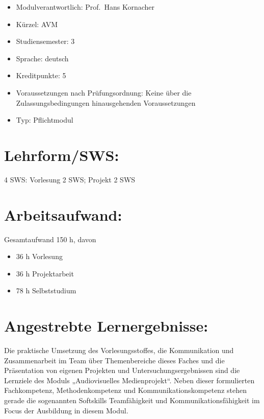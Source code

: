 \begin{itemize}
\tightlist
\item
  Modulverantwortlich: Prof.~Hans Kornacher
\item
  Kürzel: AVM
\item
  Studiensemester: 3
\item
  Sprache: deutsch
\item
  Kreditpunkte: 5
\item
  Voraussetzungen nach Prüfungsordnung: Keine über die
  Zulassungsbedingungen hinausgehenden Voraussetzungen
\item
  Typ: Pflichtmodul
\end{itemize}

\section*{Lehrform/SWS:}\label{lehrformsws-2}

4 SWS: Vorlesung 2 SWS; Projekt 2 SWS

\section*{Arbeitsaufwand:}\label{arbeitsaufwand-2}

Gesamtaufwand 150 h, davon

\begin{itemize}
\tightlist
\item
  36 h Vorlesung
\item
  36 h Projektarbeit
\item
  78 h Selbststudium
\end{itemize}

\section*{Angestrebte
Lernergebnisse:}\label{angestrebte-lernergebnisse-2}

Die praktische Umsetzung des Vorlesungsstoffes, die Kommunikation und
Zusammenarbeit im Team über Themenbereiche dieses Faches und die
Präsentation von eigenen Projekten und Untersuchungsergebnissen sind die
Lernziele des Moduls „Audiovisuelles Medienprojekt``. Neben dieser
formulierten Fachkompetenz, Methodenkompetenz und
Kommunikationskompetenz stehen gerade die sogenannten Softskills
Teamfähigkeit und Kommunikationsfähigkeit im Focus der Ausbildung in
diesem Modul.


